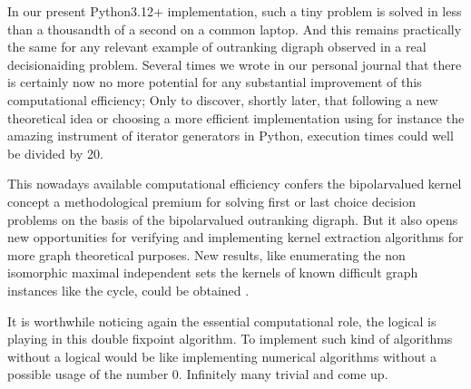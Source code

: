 \documentclass[a4paper,12pt,english]{sphinxhowto}
\begin{document}
\sphinxAtStartPar
In our present Python3.12+ implementation, such a tiny problem is solved in less than a thousandth of a second on a common laptop. And this remains practically the same for any relevant example of outranking digraph observed in a real decision\sphinxhyphen{}aiding problem. Several times we wrote in our personal journal that there is certainly now no more potential for any substantial improvement of this computational efficiency; Only to discover, shortly later, that following a new theoretical idea or choosing a more efficient implementation \textendash{}\sphinxhyphen{}using for instance the amazing instrument of iterator generators in Python\textendash{}\sphinxhyphen{}, execution times could well be divided by 20.

\sphinxAtStartPar
This nowadays available computational efficiency confers the bipolar\sphinxhyphen{}valued kernel concept a methodological premium for solving first or last choice decision problems on the basis of the bipolar\sphinxhyphen{}valued outranking digraph. But it also opens new opportunities for verifying and implementing kernel extraction algorithms for more graph theoretical purposes. New results, like enumerating the non isomorphic maximal independent sets \textendash{}the kernels\textendash{} of known difficult graph instances like the \sphinxhyphen{}cycle, could be obtained .

\sphinxAtStartPar
It is worthwhile noticing again the essential computational role, the logical  is playing in this double fixpoint algorithm. To implement such kind of algorithms without a logical  would be like implementing numerical algorithms without a possible usage of the number 0. Infinitely many trivial  and  come up.
\end{document}
